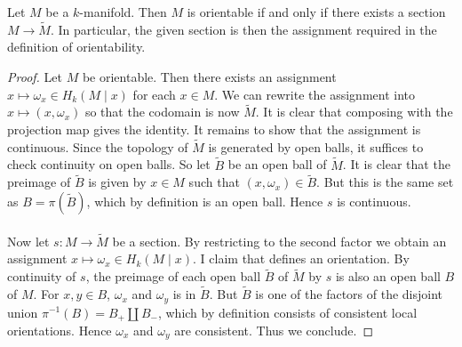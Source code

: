\documentclass[a4paper]{article}
\begin{document}
\begin{lmm}{}{} Let $M$ be a $k$-manifold. Then $M$ is orientable if and only if there exists a section $M\to\widetilde{M}$. In particular, the given section is then the assignment required in the definition of orientability. \tcbline
\begin{proof}
Let $M$ be orientable. Then there exists an assignment $x\mapsto\omega_x\in H_k(M\;|\;x)$ for each $x\in M$. We can rewrite the assignment into $x\mapsto(x,\omega_x)$ so that the codomain is now $\widetilde{M}$. It is clear that composing with the projection map gives the identity. It remains to show that the assignment is continuous. Since the topology of $\widetilde{M}$ is generated by open balls, it suffices to check continuity on open balls. So let $\widetilde{B}$ be an open ball of $\widetilde{M}$. It is clear that the preimage of $\widetilde{B}$ is given by $x\in M$ such that $(x,\omega_x)\in\widetilde{B}$. But this is the same set as $B=\pi(\widetilde{B})$, which by definition is an open ball. Hence $s$ is continuous. \\~\\

Now let $s:M\to\tilde{M}$ be a section. By restricting to the second factor we obtain an assignment $x\mapsto\omega_x\in H_k(M\;|\;x)$. I claim that defines an orientation. By continuity of $s$, the preimage of each open ball $\widetilde{B}$ of $\widetilde{M}$ by $s$ is also an open ball $B$ of $M$. For $x,y\in B$, $\omega_x$ and $\omega_y$ is in $\widetilde{B}$. But $\widetilde{B}$ is one of the factors of the disjoint union $\pi^{-1}(B)=B_+\amalg B_-$, which by definition consists of consistent local orientations. Hence $\omega_x$ and $\omega_y$ are consistent. Thus we conclude. 
\end{proof}
\end{lmm}
\end{document}
